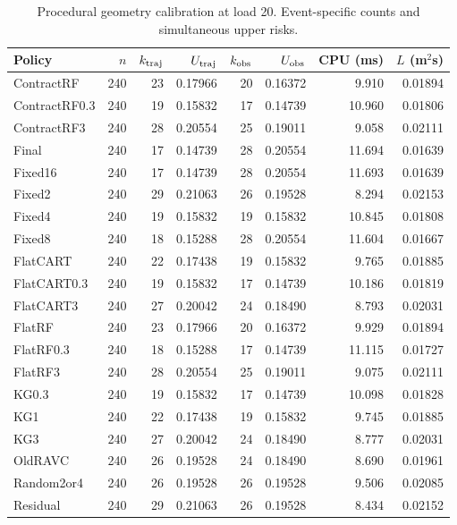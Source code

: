 \begin{table}[!htbp]\centering\footnotesize
\caption{Procedural geometry calibration at load 20. Event-specific counts and simultaneous upper risks.}\label{supp:calgeometry_calibration20}
\begin{tabular}{@{}lrrrrrrr@{}}\toprule
Policy & $n$ & $k_{\rm traj}$ & $U_{\rm traj}$ & $k_{\rm obs}$ & $U_{\rm obs}$ & CPU (ms) & $L$ (m$^2$s)\\\midrule
ContractRF & 240 & 23 & 0.17966 & 20 & 0.16372 & 9.910 & 0.01894\\
ContractRF0.3 & 240 & 19 & 0.15832 & 17 & 0.14739 & 10.960 & 0.01806\\
ContractRF3 & 240 & 28 & 0.20554 & 25 & 0.19011 & 9.058 & 0.02111\\
Final & 240 & 17 & 0.14739 & 28 & 0.20554 & 11.694 & 0.01639\\
Fixed16 & 240 & 17 & 0.14739 & 28 & 0.20554 & 11.693 & 0.01639\\
Fixed2 & 240 & 29 & 0.21063 & 26 & 0.19528 & 8.294 & 0.02153\\
Fixed4 & 240 & 19 & 0.15832 & 19 & 0.15832 & 10.845 & 0.01808\\
Fixed8 & 240 & 18 & 0.15288 & 28 & 0.20554 & 11.604 & 0.01667\\
FlatCART & 240 & 22 & 0.17438 & 19 & 0.15832 & 9.765 & 0.01885\\
FlatCART0.3 & 240 & 19 & 0.15832 & 17 & 0.14739 & 10.186 & 0.01819\\
FlatCART3 & 240 & 27 & 0.20042 & 24 & 0.18490 & 8.793 & 0.02031\\
FlatRF & 240 & 23 & 0.17966 & 20 & 0.16372 & 9.929 & 0.01894\\
FlatRF0.3 & 240 & 18 & 0.15288 & 17 & 0.14739 & 11.115 & 0.01727\\
FlatRF3 & 240 & 28 & 0.20554 & 25 & 0.19011 & 9.075 & 0.02111\\
KG0.3 & 240 & 19 & 0.15832 & 17 & 0.14739 & 10.098 & 0.01828\\
KG1 & 240 & 22 & 0.17438 & 19 & 0.15832 & 9.745 & 0.01885\\
KG3 & 240 & 27 & 0.20042 & 24 & 0.18490 & 8.777 & 0.02031\\
OldRAVC & 240 & 26 & 0.19528 & 24 & 0.18490 & 8.690 & 0.01961\\
Random2or4 & 240 & 26 & 0.19528 & 26 & 0.19528 & 9.506 & 0.02085\\
Residual & 240 & 29 & 0.21063 & 26 & 0.19528 & 8.434 & 0.02152\\
\bottomrule\end{tabular}\end{table}

